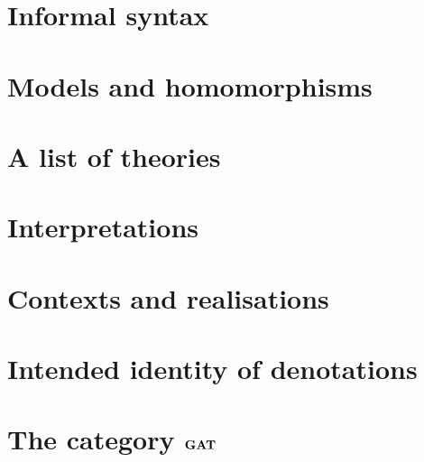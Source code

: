 \section{Informal syntax} \label{sec:source-1-8}

\lipsum[7]

\section{Models and homomorphisms} \label{sec:source-1-9}

\lipsum[8]

\section{A list of theories} \label{sec:source-1-10}

\lipsum[9]

\section{Interpretations} \label{sec:source-1-11}

\lipsum[10]

\section{Contexts and realisations} \label{sec:source-1-12}

\lipsum[11]

\section{Intended identity of denotations} \label{sec:source-1-13}

\lipsum[12]

\section{The category $\mathbf{GAT}$} \label{sec:source-1-14}

\lipsum[13]

